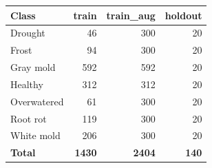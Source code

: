 \begin{tabular}{lrrr}
\toprule
Class & train & train\_aug & holdout \\
\midrule
Drought & 46 & 300 & 20 \\
Frost & 94 & 300 & 20 \\
Gray mold & 592 & 592 & 20 \\
Healthy & 312 & 312 & 20 \\
Overwatered & 61 & 300 & 20 \\
Root rot & 119 & 300 & 20 \\
White mold & 206 & 300 & 20 \\
\textbf{Total} & \textbf{1430} & \textbf{2404} & \textbf{140} \\
\bottomrule
\end{tabular}
